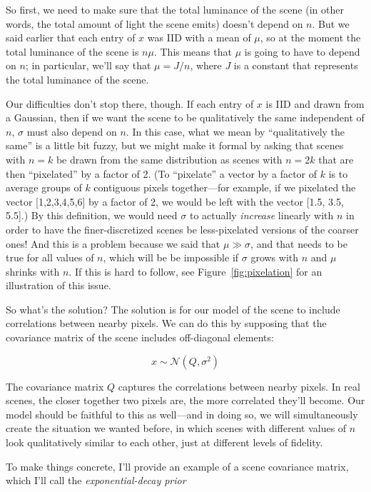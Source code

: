 So first, we need to make sure that the total luminance of the scene (in other words, the total amount of light the scene emits) doesn't depend on $n$. But we said earlier that each entry of $x$ was IID with a mean of $\mu$, so at the moment the total luminance of the scene is $n \mu$. This means that $\mu$ is going to have to depend on $n$; in particular, we'll say that $\mu = J/n$, where $J$ is a constant that represents the total luminance of the scene.

Our difficulties don't stop there, though. If each entry of $x$ is IID and drawn from a Gaussian, then if we want the scene to be qualitatively the same independent of $n$, $\sigma$ must also depend on $n$. In this case, what we mean by ``qualitatively the same'' is a little bit fuzzy, but we might make it formal by asking that scenes with $n=k$ be drawn from the same distribution as scenes with $n=2k$ that are then ``pixelated'' by a factor of 2. (To ``pixelate'' a vector by a factor of $k$ is to average groups of $k$ contiguous pixels together---for example, if we pixelated the vector [1,2,3,4,5,6] by a factor of 2, we would be left with the vector [1.5, 3.5, 5.5].) By this definition, we would need $\sigma$ to actually \emph{increase} linearly with $n$ in order to have the finer-discretized scenes be less-pixelated versions of the coarser ones! And this is a problem because we said that $\mu \gg \sigma$, and that needs to be true for all values of $n$, which will be be impossible if $\sigma$ grows with $n$ and $\mu$ shrinks with $n$. If this is hard to follow, see Figure~\ref{fig:pixelation} for an illustration of this issue.

So what's the solution? The solution is for our model of the scene to include correlations between nearby pixels. We can do this by supposing that the covariance matrix of the scene includes off-diagonal elements:

$$x \sim \mathcal{N}(Q, \sigma^2)$$

The covariance matrix $Q$ captures the correlations between nearby pixels. In real scenes, the closer together two pixels are, the more correlated they'll become. Our model should be faithful to this as well---and in doing so, we will simultaneously create the situation we wanted before, in which scenes with different values of $n$ look qualitatively similar to each other, just at different levels of fidelity. 

To make things concrete, I'll provide an example of a scene covariance matrix, which I'll call the \emph{exponential-decay prior}





